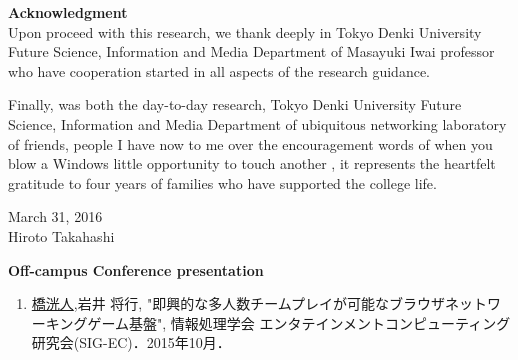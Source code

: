 \newpage
\pagestyle{plain}


\begin{flushleft}
{\huge{\bf Acknowledgment}}\\
\vspace{1cm}
Upon proceed with this research, we thank deeply in Tokyo Denki University Future Science, Information and Media Department of Masayuki Iwai professor who have cooperation started in all aspects of the research guidance.
\par
Finally, was both the day-to-day research, Tokyo Denki University Future Science, Information and Media Department of ubiquitous networking laboratory of friends, people I have now to me over the encouragement words of when you blow a Windows little opportunity to touch another , it represents the heartfelt gratitude to four years of families who have supported the college life.

\vspace{3cm}
\begin{flushright}
March 31, 2016\\
Hiroto Takahashi\\
\end{flushright}
\end{flushleft}



\newpage




\begin{flushleft}
{\huge{\bf Off-campus Conference presentation}}\\
\vspace{1cm}
\begin{enumerate}
	
\item \underline{橋洸人},岩井 将行, "即興的な多人数チームプレイが可能なブラウザネットワーキングゲーム基盤", 情報処理学会 エンタテインメントコンピューティング研究会(SIG-EC)．2015年10月．

\end{enumerate}
\end{flushleft}

